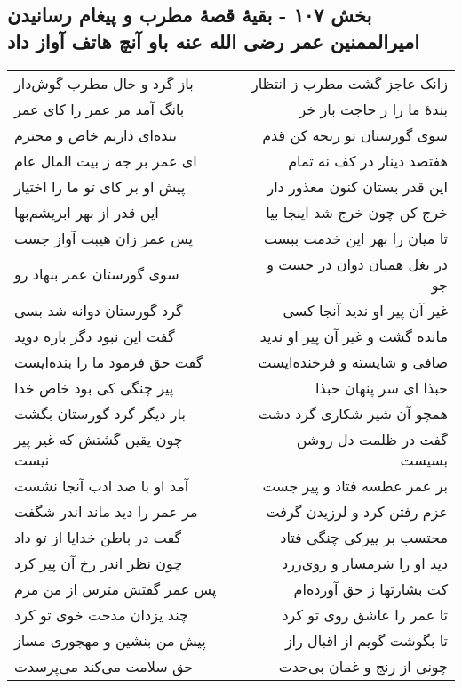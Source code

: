 \begin{center}
\section*{بخش ۱۰۷ - بقیهٔ قصهٔ مطرب و پیغام رسانیدن امیرالممنین عمر رضی الله عنه باو آنچ هاتف آواز داد}
\label{sec:sh107}
\begin{longtable}{l p{0.5cm} r}
باز گرد و حال مطرب گوش‌دار
&&
زانک عاجز گشت مطرب ز انتظار
\\
بانگ آمد مر عمر را کای عمر
&&
بندهٔ ما را ز حاجت باز خر
\\
بنده‌ای داریم خاص و محترم
&&
سوی گورستان تو رنجه کن قدم
\\
ای عمر بر جه ز بیت المال عام
&&
هفتصد دینار در کف نه تمام
\\
پیش او بر کای تو ما را اختیار
&&
این قدر بستان کنون معذور دار
\\
این قدر از بهر ابریشم‌بها
&&
خرج کن چون خرج شد اینجا بیا
\\
پس عمر زان هیبت آواز جست
&&
تا میان را بهر این خدمت ببست
\\
سوی گورستان عمر بنهاد رو
&&
در بغل همیان دوان در جست و جو
\\
گرد گورستان دوانه شد بسی
&&
غیر آن پیر او ندید آنجا کسی
\\
گفت این نبود دگر باره دوید
&&
مانده گشت و غیر آن پیر او ندید
\\
گفت حق فرمود ما را بنده‌ایست
&&
صافی و شایسته و فرخنده‌ایست
\\
پیر چنگی کی بود خاص خدا
&&
حبذا ای سر پنهان حبذا
\\
بار دیگر گرد گورستان بگشت
&&
همچو آن شیر شکاری گرد دشت
\\
چون یقین گشتش که غیر پیر نیست
&&
گفت در ظلمت دل روشن بسیست
\\
آمد او با صد ادب آنجا نشست
&&
بر عمر عطسه فتاد و پیر جست
\\
مر عمر را دید ماند اندر شگفت
&&
عزم رفتن کرد و لرزیدن گرفت
\\
گفت در باطن خدایا از تو داد
&&
محتسب بر پیرکی چنگی فتاد
\\
چون نظر اندر رخ آن پیر کرد
&&
دید او را شرمسار و روی‌زرد
\\
پس عمر گفتش مترس از من مرم
&&
کت بشارتها ز حق آورده‌ام
\\
چند یزدان مدحت خوی تو کرد
&&
تا عمر را عاشق روی تو کرد
\\
پیش من بنشین و مهجوری مساز
&&
تا بگوشت گویم از اقبال راز
\\
حق سلامت می‌کند می‌پرسدت
&&
چونی از رنج و غمان بی‌حدت

\end{longtable}
\end{center}
